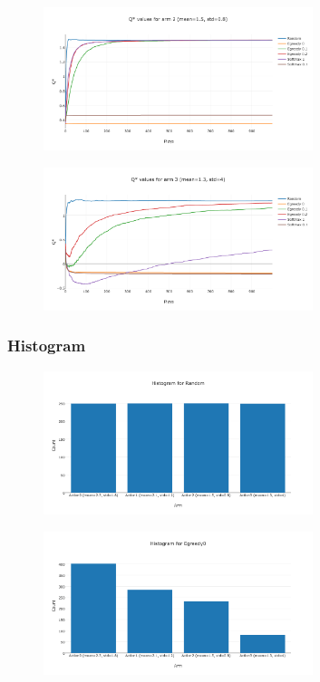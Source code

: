 \documentclass[11pt]{article}
\begin{document}
\begin{figure}[H]
   \centering
   \includegraphics[width=0.7\textwidth]{img/1-2/q3.png}
\end{figure}


\begin{figure}[H]
   \centering
   \includegraphics[width=0.7\textwidth]{img/1-2/q4.png}
\end{figure}


\subsubsection{Histogram}

\begin{figure}[H]
   \centering
   \includegraphics[width=0.7\textwidth]{img/1-2/h1.png}
\end{figure}

\begin{figure}[H]
   \centering
   \includegraphics[width=0.7\textwidth]{img/1-2/h2.png}
\end{figure}
\end{document}

